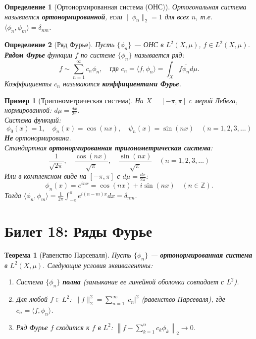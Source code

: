 \documentclass[a4paper, 12pt]{article}
\newtheorem{definition}{Определение}
\newtheorem{theorem}{Теорема}
\newtheorem{example}{Пример}
\newcommand{\Z}{\mathbb{Z}}
\newcommand{\1}{\mathbf{1}}
\begin{document}
\begin{definition}[Ортонормированная система (ОНС)]
    Ортогональная система называется \textbf{ортонормированной}, если $\|\phi_n\|_2 = 1$ для всех $n$, т.е. $\langle \phi_n, \phi_m \rangle = \delta_{nm}$.
\end{definition}

\begin{definition}[Ряд Фурье]
    Пусть $\{\phi_n\}$ — ОНС в $L^2(X, \mu)$, $f \in L^2(X, \mu)$. \textbf{Рядом Фурье} функции $f$ по системе $\{\phi_n\}$ называется ряд:
    \[
    f \sim \sum_{n=1}^{\infty} c_n \phi_n, \quad \text{где } c_n = \langle f, \phi_n \rangle = \int_X f \overline{\phi_n}  d\mu.
    \]
    Коэффициенты $c_n$ называются \textbf{коэффициентами Фурье}.
\end{definition}

\begin{example}[Тригонометрическая система]
    На $X = [-\pi, \pi]$ с мерой Лебега, нормированной: $d\mu = \frac{dx}{2\pi}$. \\
    Система функций:
    \[
    \phi_0(x) = 1, \quad \phi_n(x) = \cos(nx), \quad \psi_n(x) = \sin(nx) \quad (n = 1,2,3,\dots)
    \]
    \textbf{Не} ортонормирована. \\
    Стандартная \textbf{ортонормированная тригонометрическая система}:
    \[
    \frac{1}{\sqrt{2\pi}}, \quad \frac{\cos(nx)}{\sqrt{\pi}}, \quad \frac{\sin(nx)}{\sqrt{\pi}} \quad (n=1,2,3,\dots)
    \]
    Или в комплексном виде на $[-\pi, \pi]$ с $d\mu = \frac{dx}{2\pi}$:
    \[
    \phi_n(x) = e^{inx} = \cos(nx) + i\sin(nx) \quad (n \in \Z).
    \]
    Тогда $\langle \phi_n, \phi_m \rangle = \frac{1}{2\pi} \int_{-\pi}^{\pi} e^{i(n-m)x}  dx = \delta_{nm}$.
\end{example}

\section*{Билет 18: Ряды Фурье}
\begin{theorem}[Равенство Парсеваля]
    Пусть $\{\phi_n\}$ — \textbf{ортонормированная система} в $L^2(X, \mu)$. Следующие условия эквивалентны:
    \begin{enumerate}[label=(\roman*)]
        \item Система $\{\phi_n\}$ \textbf{полна} (замыкание ее линейной оболочки совпадает с $L^2$).
        \item Для любой $f \in L^2$: $\|f\|_2^2 = \sum_{n=1}^{\infty} |c_n|^2$ (равенство Парсеваля), где $c_n = \langle f, \phi_n \rangle$.
        \item Ряд Фурье $f$ сходится к $f$ в $L^2$: $\left\| f - \sum_{k=1}^n c_k \phi_k \right\|_2 \to 0$.
    \end{enumerate}
\end{theorem}
\end{document}
